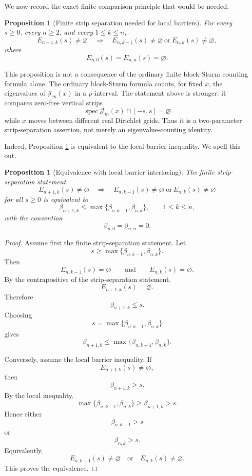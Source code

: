 \documentclass[11pt]{amsart}
\numberwithin{equation}{section}
\newtheorem{proposition}[theorem]{Proposition}
\DeclareMathOperator{\spec}{spec}
\begin{document}
We now record the exact finite comparison principle that would be needed.

\begin{proposition}[Finite strip separation needed for local barriers]
\label{prop:needed-strip-separation}
For every \(s\ge0\), every \(n\ge2\), and every \(1\le k\le n\),
\[
        E_{n+1,k}(s)\ne\varnothing
        \quad\Longrightarrow\quad
        E_{n,k-1}(s)\ne\varnothing
        \ \text{or}\
        E_{n,k}(s)\ne\varnothing,
\]
where
\[
        E_{n,0}(s)=E_{n,n}(s)=\varnothing.
\]
\end{proposition}

This proposition is not a consequence of the ordinary finite block-Sturm
counting formula alone.  The ordinary block-Sturm formula counts, for fixed
\(x\), the eigenvalues of \(\mathcal J_m(x)\) in a \(\rho\)-interval.  The
statement above is stronger: it compares zero-free vertical strips
\[
        \spec\mathcal J_m(x)\cap[-s,s]=\varnothing
\]
while \(x\) moves between different real Dirichlet grids.  Thus it is a
two-parameter strip-separation assertion, not merely an eigenvalue-counting
identity.

Indeed, Proposition \ref{prop:needed-strip-separation} is equivalent to the
local barrier inequality.  We spell this out.

\begin{proposition}[Equivalence with local barrier interlacing]
\label{prop:equivalence-local}
The finite strip-separation statement
\[
        E_{n+1,k}(s)\ne\varnothing
        \quad\Longrightarrow\quad
        E_{n,k-1}(s)\ne\varnothing
        \ \text{or}\
        E_{n,k}(s)\ne\varnothing
\]
for all \(s\ge0\) is equivalent to
\[
        \beta_{n+1,k}
        \le
        \max\{\beta_{n,k-1},\beta_{n,k}\},
        \qquad 1\le k\le n,
\]
with the convention
\[
        \beta_{n,0}=\beta_{n,n}=0.
\]
\end{proposition}

\begin{proof}
Assume first the finite strip-separation statement.  Let
\[
        s\ge \max\{\beta_{n,k-1},\beta_{n,k}\}.
\]
Then
\[
        E_{n,k-1}(s)=\varnothing
        \qquad\text{and}\qquad
        E_{n,k}(s)=\varnothing.
\]
By the contrapositive of the strip-separation statement,
\[
        E_{n+1,k}(s)=\varnothing.
\]
Therefore
\[
        \beta_{n+1,k}\le s.
\]
Choosing
\[
        s=\max\{\beta_{n,k-1},\beta_{n,k}\}
\]
gives
\[
        \beta_{n+1,k}
        \le
        \max\{\beta_{n,k-1},\beta_{n,k}\}.
\]

Conversely, assume the local barrier inequality.  If
\[
        E_{n+1,k}(s)\ne\varnothing,
\]
then
\[
        \beta_{n+1,k}>s.
\]
By the local inequality,
\[
        \max\{\beta_{n,k-1},\beta_{n,k}\}
        \ge
        \beta_{n+1,k}
        >
        s.
\]
Hence either
\[
        \beta_{n,k-1}>s
\]
or
\[
        \beta_{n,k}>s.
\]
Equivalently,
\[
        E_{n,k-1}(s)\ne\varnothing
        \quad\text{or}\quad
        E_{n,k}(s)\ne\varnothing.
\]
This proves the equivalence.
\end{proof}
\end{document}
